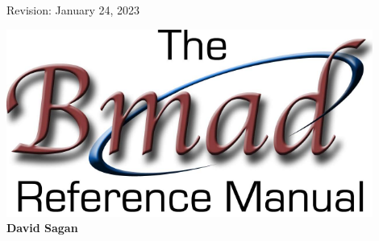 
\thispagestyle{empty}

\begin{flushright}
\large
  Revision: January 24, 2023 \\
\end{flushright}


\vfill

{
\begin{center}
\includegraphics[width=12cm]{bmad-ref-manual.pdf} \\
\vskip 0.3in
\huge\bf David Sagan
\end{center}
}

\vfill
\break
